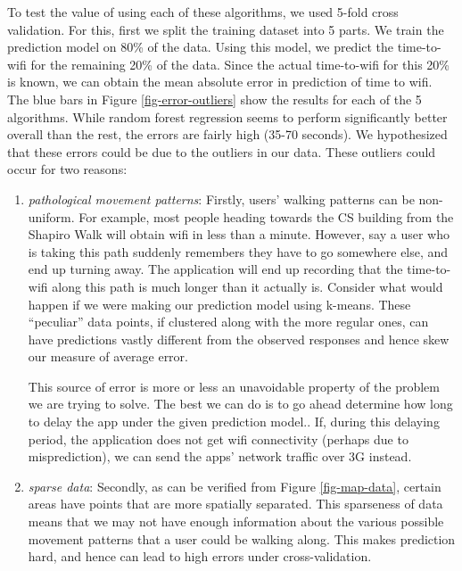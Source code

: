 \documentclass[12pt, fleqn]{article}
\begin{document}
To test the value of using each of these algorithms, we used 5-fold cross 
validation. For this, first we split the training dataset into 5 parts. We  
train the prediction model on 80\% of the data. Using this model, we predict the time-to-wifi for 
the remaining 20\% of the data. Since the actual time-to-wifi for this 20\% is 
known, we can obtain the mean absolute error in prediction of time to wifi. The blue bars in Figure \ref{fig-error-outliers} 
show the results for each of the 5 algorithms. While random forest regression seems to 
perform significantly better overall than the rest, the errors are fairly high (35-70 seconds). We hypothesized 
that these errors could be due to the outliers in our data. These outliers could occur for 
two reasons:
\begin{enumerate}
  \item \emph{pathological movement patterns}: Firstly, users’ walking patterns can be non-uniform. For example,  
most people heading towards the CS building from the Shapiro Walk will obtain wifi in 
less than a minute. However, say a user who is taking this path suddenly 
remembers they have to go somewhere else, and end up turning away. The 
application will end up recording that the time-to-wifi along this path is much 
longer than it actually is. Consider what would happen if we were making our
prediction model using k-means. These “peculiar” data points, if clustered along with the more 
regular ones, can have predictions vastly different from the observed responses and 
hence skew our measure of average error. 

This source of error is more or less an unavoidable property of 
the problem we are trying to solve. The best we can do is to go ahead determine how long
to delay the app under the given prediction model.. If, during this delaying period, the application does 
not get wifi connectivity (perhaps due to misprediction), we can send the 
apps' network traffic over 3G instead.

  \item \emph{sparse data}: Secondly, as can be verified from Figure \ref{fig-map-data}, certain 
  areas have points that are more spatially separated. This sparseness of data means that we may 
not have enough information about the various possible movement patterns that a 
user could be walking along. This makes prediction hard, and hence can lead to high errors
under cross-validation. 


\end{enumerate}
\end{document}
